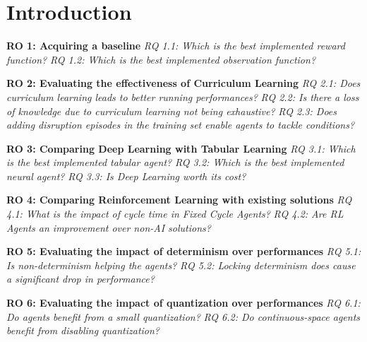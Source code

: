 \chapter{Introduction}

\hfill \break
\noindent
\textbf{\hypertarget{ro1}{RO 1}: Acquiring a baseline}
\hfill \break
\textit{\hypertarget{rq1.1}{RQ 1.1}: Which is the best implemented reward function?}
\hfill \break
\textit{\hypertarget{rq1.2}{RQ 1.2}: Which is the best implemented observation function?}

\hfill \break
\noindent
\textbf{\hypertarget{ro2}{RO 2}: Evaluating the effectiveness of Curriculum Learning}
\hfill \break
\textit{\hypertarget{rq2.1}{RQ 2.1}: Does curriculum learning leads to better running performances?}
\hfill \break
\textit{\hypertarget{rq2.2}{RQ 2.2}: Is there a loss of knowledge due to curriculum learning not being exhaustive?}
\hfill \break
\textit{\hypertarget{rq2.3}{RQ 2.3}: Does adding disruption episodes in the training set enable agents to tackle conditions?}

\hfill \break
\noindent
\textbf{\hypertarget{ro3}{RO 3}: Comparing Deep Learning with Tabular Learning}
\hfill \break
\textit{\hypertarget{rq3.1}{RQ 3.1}: Which is the best implemented tabular agent?}
\hfill \break
\textit{\hypertarget{rq3.2}{RQ 3.2}: Which is the best implemented neural agent?}
\hfill \break
\textit{\hypertarget{rq3.3}{RQ 3.3}: Is Deep Learning worth its cost?}

\hfill \break
\noindent
\textbf{\hypertarget{ro4}{RO 4}: Comparing Reinforcement Learning with existing solutions}
\hfill \break
\textit{\hypertarget{rq4.1}{RQ 4.1}: What is the impact of cycle time in Fixed Cycle Agents?}
\hfill \break
\textit{\hypertarget{rq4.2}{RQ 4.2}: Are RL Agents an improvement over non-AI solutions?}

\hfill \break
\noindent
\textbf{\hypertarget{ro5}{RO 5}: Evaluating the impact of determinism over performances}
\hfill \break
\textit{\hypertarget{rq5.1}{RQ 5.1}: Is non-determinism helping the agents?}
\hfill \break
\textit{\hypertarget{rq5.2}{RQ 5.2}: Locking determinism does cause a significant drop in performance?}

\hfill \break
\noindent
\textbf{\hypertarget{ro6}{RO 6}: Evaluating the impact of quantization over performances}
\hfill \break
\textit{\hypertarget{rq6.1}{RQ 6.1}: Do agents benefit from a small quantization?}
\hfill \break
\textit{\hypertarget{rq6.2}{RQ 6.2}: Do continuous-space agents benefit from disabling quantization?}


